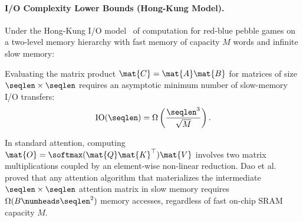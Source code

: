 \paragraph{I/O Complexity Lower Bounds (Hong-Kung Model).}
Under the Hong-Kung I/O model~\cite{hong1981io} of computation for red-blue pebble games on a two-level memory hierarchy with fast memory of capacity $M$ words and infinite slow memory:
\begin{theorem}
Evaluating the matrix product $\mat{C} = \mat{A} \mat{B}$ for matrices of size $\seqlen \times \seqlen$ requires an asymptotic minimum number of slow-memory I/O transfers:
\begin{equation}
\operatorname{IO}(\seqlen) = \Omega\left(\frac{\seqlen^3}{\sqrt{M}}\right).
\end{equation}
\end{theorem}
In standard attention, computing $\mat{O} = \softmax(\mat{Q}\mat{K}^\top)\mat{V}$ involves two matrix multiplications coupled by an element-wise non-linear reduction. Dao et al.~\cite{dao2022flashattention} proved that any attention algorithm that materializes the intermediate $\seqlen \times \seqlen$ attention matrix in slow memory requires $\Omega(B \numheads \seqlen^2)$ memory accesses, regardless of fast on-chip SRAM capacity $M$.

